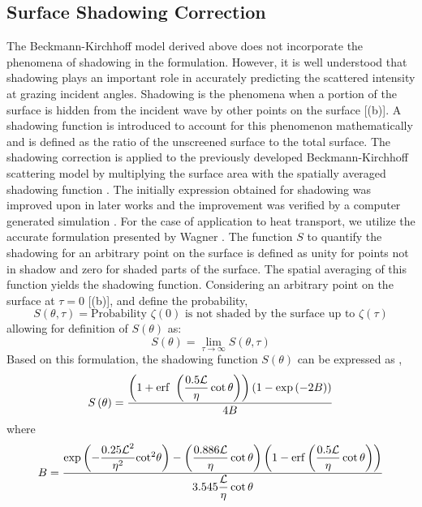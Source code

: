 \subsection{Surface Shadowing Correction}
The Beckmann-Kirchhoff model derived above does not incorporate the phenomena of shadowing in the formulation. However, it is well understood \cite{RN86} that shadowing plays an important role in accurately predicting the scattered intensity at grazing incident angles. Shadowing is the phenomena when a portion of the surface is hidden from the incident wave by other points on the surface [(b)]. A shadowing function is introduced to account for this phenomenon mathematically and is defined as the ratio of the unscreened surface to the total surface. The shadowing correction is applied to the previously developed Beckmann-Kirchhoff scattering model by multiplying the surface area with the spatially averaged shadowing function \cite{book_Beckmann}. The initially expression obtained for shadowing was improved upon in later works \cite{RN299,RN87} and the improvement was verified by a computer generated simulation \cite{RN92}. For the case of application to heat transport, we utilize the accurate formulation presented by Wagner \cite{RN299}. 
The function $S$ to quantify the shadowing for an arbitrary point on the surface is defined as unity for points not in shadow and zero for shaded parts of the surface. The spatial averaging of this function yields the shadowing function. Considering an arbitrary point on the surface at $\tau=0$ [(b)], and define the probability,
\begin{equation}
S\left(\theta,\tau\right)=\text{Probability $\zeta\left(0\right)$ is not shaded by the surface up to $\zeta\left(\tau\right)$}
\end{equation}
allowing for definition of  $S(\theta)$ as:
\begin{equation}
S(\theta)=\lim_{\tau\to\infty} S\left(\theta,\tau\right)
\end{equation}
Based on this formulation, the shadowing function $S(\theta)$ can be expressed as \cite{RN299},
\begin{equation}
S\left(\theta\right)=\frac{\left(1+\erf\ {\left(\dfrac{0.5\mathcal{L}}{\eta}\cot\theta\right)}\right)\left(1-\exp{\left(-2B\right)}\right)}{4B}
\label{eq:shadowing-full}
\end{equation}
where
\begin{equation}
B=\frac{\exp{\left(-\dfrac{{0.25\mathcal{L}}^2}{\eta^2}{\cot}^2\theta\right)}-\left(\dfrac{0.886\mathcal{L}}{\eta}\cot\theta\right)\left(1-\operatorname{erf}\left(\dfrac{0.5\mathcal{L}}{\eta}\cot\theta\right)\right)}{3.545\dfrac{\mathcal{L}}{\eta}\cot\theta}
\end{equation}
